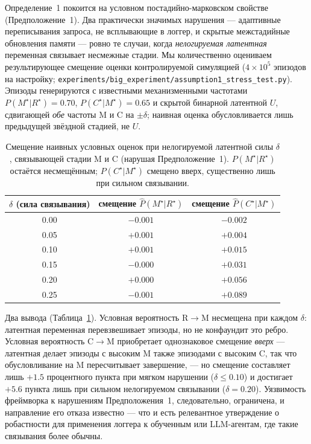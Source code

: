\documentclass{article}
\newcommand{\method}[1]{\texttt{#1}}
\begin{document}
Определение~1 покоится на условном постадийно-марковском свойстве (Предположение~1). Два практически значимых нарушения --- адаптивные переписывания запроса, не всплывающие в логгер, и скрытые межстадийные обновления памяти --- ровно те случаи, когда \emph{нелогируемая латентная} переменная связывает несмежные стадии. Мы количественно оцениваем результирующее смещение оценки контролируемой симуляцией ($4\!\times\!10^5$ эпизодов на настройку; \method{experiments/big\_experiment/assumption1\_stress\_test.py}). Эпизоды генерируются с известными механизменными частотами $P(M^\star|R^\star){=}0.70$, $P(C^\star|M^\star){=}0.65$ и скрытой бинарной латентной $U$, сдвигающей \emph{обе} частоты M и C на $\pm\delta$; наивная оценка обусловливается лишь предыдущей звёздной стадией, не $U$.

\begin{table}[h]
\caption{Смещение наивных условных оценок при нелогируемой латентной силы $\delta$, связывающей стадии M и C (нарушая Предположение~1). $P(M^\star|R^\star)$ остаётся несмещённым; $P(C^\star|M^\star)$ смещено вверх, существенно лишь при сильном связывании.}
\label{tab:assumption1-stress}
\centering
\small
\begin{tabular}{c c c}
\toprule
$\delta$ (сила связывания) & смещение $\hat P(M^\star|R^\star)$ & смещение $\hat P(C^\star|M^\star)$ \\
\midrule
0.00 & $-0.001$ & $-0.002$ \\
0.05 & $+0.001$ & $+0.004$ \\
0.10 & $+0.001$ & $+0.015$ \\
0.15 & $-0.000$ & $+0.031$ \\
0.20 & $+0.000$ & $+0.056$ \\
0.25 & $-0.001$ & $+0.089$ \\
\bottomrule
\end{tabular}
\end{table}

Два вывода (Таблица~\ref{tab:assumption1-stress}). Условная вероятность R$\to$M несмещена при каждом $\delta$: латентная переменная перевзвешивает эпизоды, но не конфаундит это ребро. Условная вероятность C$\to$M приобретает однознаковое смещение \emph{вверх} --- латентная делает эпизоды с высоким M также эпизодами с высоким C, так что обусловливание на M пересчитывает завершение, --- но смещение составляет лишь $+1.5$ процентного пункта при мягком нарушении ($\delta\!\le\!0.10$) и достигает $+5.6$ пункта лишь при сильном нелогируемом связывании ($\delta{=}0.20$). Уязвимость фреймворка к нарушениям Предположения~1, следовательно, ограничена, и направление его отказа известно --- что и есть релевантное утверждение о робастности для применения логгера к обученным или LLM-агентам, где такие связывания более обычны.
\end{document}
